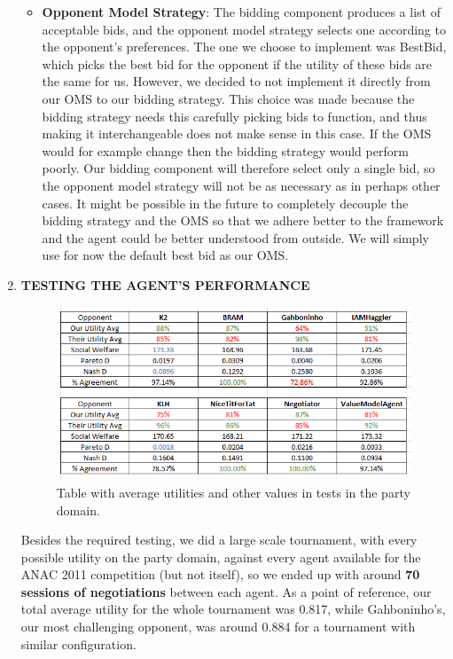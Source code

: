 \documentclass{article}
\begin{document}
\begin{enumerate}
\begin{itemize}
\item \textbf{Opponent Model Strategy}: 
The bidding component produces a list of acceptable bids, and the opponent model strategy selects one according to the opponent's preferences. The one we choose to implement was BestBid, which picks the best bid for the opponent if the utility of these bids are the same for us. However, we decided to not implement it directly from our OMS to our bidding strategy. This choice was made because the bidding strategy needs this carefully picking bids to function, and thus making it interchangeable does not make sense in this case. If the OMS would for example change then the bidding strategy would perform poorly. Our bidding component will therefore select only a single bid, so the opponent model strategy will not be as necessary as in perhaps other cases. It might be possible in the future to completely decouple the bidding strategy and the OMS so that we adhere better to the framework and the agent could be better understood from outside. We will simply use for now the default best bid as our OMS.\\
\end{itemize}

\item \textbf{TESTING THE AGENT'S PERFORMANCE}

\begin{figure}[h!]
    \centering
    \includegraphics[width=420pt]{table-party.png}
    \caption{Table with average utilities and other values in tests in the party domain.}
    \label{fig:party-vs-agent007}
\end{figure}

Besides the required testing, we did a large scale tournament, with every possible utility on the party domain, against every agent available for the ANAC 2011 competition (but not itself), so we ended up with around \textbf{70 sessions of negotiations} between each agent. As a point of reference, our total average utility for the whole tournament was 0.817, while Gahboninho's, our most challenging opponent, was around 0.884 for a tournament with similar configuration.


\end{enumerate}
\end{document}
